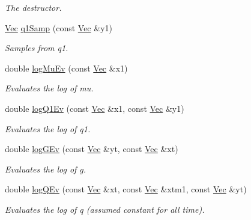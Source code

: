 \begin{DoxyCompactItemize}
\begin{DoxyCompactList}\small\item\em The destructor. \end{DoxyCompactList}\item 
\hyperlink{pmfs_8h_a4c7df05c6f5e8a0d15ae14bcdbc07152}{Vec} \hyperlink{classMSVolSISR_ac828fdce8a00f9ac3adbe0fa019fe49d}{q1\+Samp} (const \hyperlink{pmfs_8h_a4c7df05c6f5e8a0d15ae14bcdbc07152}{Vec} \&y1)
\begin{DoxyCompactList}\small\item\em Samples from q1. \end{DoxyCompactList}\item 
double \hyperlink{classMSVolSISR_a2af842b09bada27765bf8e7e60c59183}{log\+Mu\+Ev} (const \hyperlink{pmfs_8h_a4c7df05c6f5e8a0d15ae14bcdbc07152}{Vec} \&x1)
\begin{DoxyCompactList}\small\item\em Evaluates the log of mu. \end{DoxyCompactList}\item 
double \hyperlink{classMSVolSISR_a9c776bfbf157ff4f0dc3cbe1c4212142}{log\+Q1\+Ev} (const \hyperlink{pmfs_8h_a4c7df05c6f5e8a0d15ae14bcdbc07152}{Vec} \&x1, const \hyperlink{pmfs_8h_a4c7df05c6f5e8a0d15ae14bcdbc07152}{Vec} \&y1)
\begin{DoxyCompactList}\small\item\em Evaluates the log of q1. \end{DoxyCompactList}\item 
double \hyperlink{classMSVolSISR_a1e7efc4dd05351872764983a99a0c5ed}{log\+G\+Ev} (const \hyperlink{pmfs_8h_a4c7df05c6f5e8a0d15ae14bcdbc07152}{Vec} \&yt, const \hyperlink{pmfs_8h_a4c7df05c6f5e8a0d15ae14bcdbc07152}{Vec} \&xt)
\begin{DoxyCompactList}\small\item\em Evaluates the log of g. \end{DoxyCompactList}\item 
double \hyperlink{classMSVolSISR_af5ef1c3d5499bc9f2693a3f918def613}{log\+Q\+Ev} (const \hyperlink{pmfs_8h_a4c7df05c6f5e8a0d15ae14bcdbc07152}{Vec} \&xt, const \hyperlink{pmfs_8h_a4c7df05c6f5e8a0d15ae14bcdbc07152}{Vec} \&xtm1, const \hyperlink{pmfs_8h_a4c7df05c6f5e8a0d15ae14bcdbc07152}{Vec} \&yt)
\begin{DoxyCompactList}\small\item\em Evaluates the log of q (assumed constant for all time). \end{DoxyCompactList}\item 

\end{DoxyCompactItemize}
